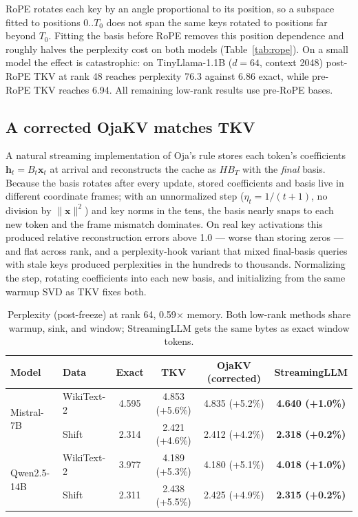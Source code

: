 \documentclass{article}
\begin{document}
RoPE rotates each key by an angle proportional to its position, so a
subspace fitted to positions $0..T_0$ does not span the same keys rotated to
positions far beyond $T_0$. Fitting the basis before RoPE removes this
position dependence and roughly halves the perplexity cost on both models
(Table~\ref{tab:rope}). On a small model the effect is catastrophic: on
TinyLlama-1.1B ($d{=}64$, context 2048) post-RoPE TKV at rank 48 reaches
perplexity 76.3 against 6.86 exact, while pre-RoPE TKV reaches 6.94. All
remaining low-rank results use pre-RoPE bases.

\subsection{A corrected OjaKV matches TKV}
\label{sec:oja}

A natural streaming implementation of Oja's rule stores each token's
coefficients $\mathbf{h}_t = B_t\mathbf{x}_t$ at arrival and reconstructs the
cache as $H B_T$ with the \emph{final} basis. Because the basis rotates after
every update, stored coefficients and basis live in different coordinate
frames; with an unnormalized step ($\eta_t = 1/(t{+}1)$, no division by
$\lVert\mathbf{x}\rVert^2$) and key norms in the tens, the basis nearly snaps
to each new token and the frame mismatch dominates. On real key activations
this produced relative reconstruction errors above 1.0 --- worse than storing
zeros --- and flat across rank, and a perplexity-hook variant that mixed
final-basis queries with stale keys produced perplexities in the hundreds to
thousands. Normalizing the step, rotating coefficients into each new basis, and
initializing from the same warmup SVD as TKV fixes both.

\begin{table}[t]
\centering
\caption{Perplexity (post-freeze) at rank 64, 0.59$\times$ memory. Both
low-rank methods share warmup, sink, and window; StreamingLLM gets the same
bytes as exact window tokens.}
\label{tab:oja}
\small
\begin{tabular}{llcccc}
\toprule
Model & Data & Exact & TKV & OjaKV (corrected) & StreamingLLM \\
\midrule
\multirow{2}{*}{Mistral-7B}  & WikiText-2 & 4.595 & 4.853 (+5.6\%) & 4.835 (+5.2\%) & \textbf{4.640 (+1.0\%)} \\
                             & Shift      & 2.314 & 2.421 (+4.6\%) & 2.412 (+4.2\%) & \textbf{2.318 (+0.2\%)} \\
\midrule
\multirow{2}{*}{Qwen2.5-14B} & WikiText-2 & 3.977 & 4.189 (+5.3\%) & 4.180 (+5.1\%) & \textbf{4.018 (+1.0\%)} \\
                             & Shift      & 2.311 & 2.438 (+5.5\%) & 2.425 (+4.9\%) & \textbf{2.315 (+0.2\%)} \\
\bottomrule
\end{tabular}
\end{table}
\end{document}
